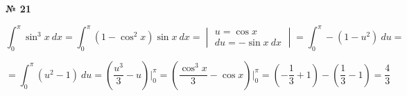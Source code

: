 \documentclass{article}
\begin{document}
\textbf{№ 21} 
\large

$$ \int_{0}^{\pi} \sin^3{x} \ dx 
= \int_{0}^{\pi} \left( 1 - \cos^2{x} \right)\sin{x} \ dx 
= \begin{vmatrix} u = \cos{x} \\
                 du = -\sin{x} \ dx \end{vmatrix}
= \int_{0}^{\pi} -\left( 1 - u^2 \right) \ du
= $$

$$ = \int_{0}^{\pi} \left( u^2 - 1 \right) \ du
= \left( \frac{u^3}{3} - u \right) \bigg\vert_{0}^{\pi}
= \left( \frac{\cos^3{x}}{3} - \cos{x} \right) \bigg\vert_{0}^{\pi} 
= \left( -\frac{1}{3} + 1 \right) - \left( \frac{1}{3} - 1 \right)
= \frac{4}{3} $$
\end{document}
